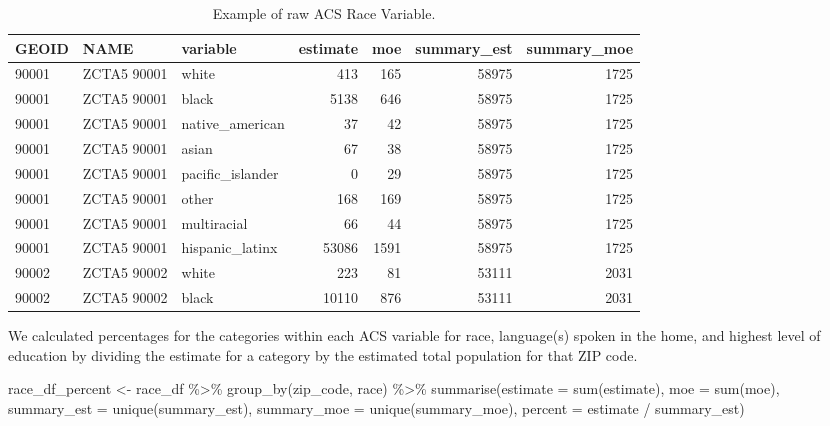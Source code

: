 \documentclass[
  11 pt,
  openany]{book}
\newenvironment{Shaded}{\begin{snugshade}}{\end{snugshade}}
\newcommand{\AttributeTok}[1]{\textcolor[rgb]{0.77,0.63,0.00}{#1}}
\newcommand{\FunctionTok}[1]{\textcolor[rgb]{0.00,0.00,0.00}{#1}}
\newcommand{\NormalTok}[1]{#1}
\newcommand{\OtherTok}[1]{\textcolor[rgb]{0.56,0.35,0.01}{#1}}
\newcommand{\SpecialCharTok}[1]{\textcolor[rgb]{0.00,0.00,0.00}{#1}}
\begin{document}
\begin{table}

\caption{\label{tab:acs-race-tab}Example of raw ACS Race Variable.}
\centering
\begin{tabular}[t]{l|l|l|r|r|r|r}
\hline
GEOID & NAME & variable & estimate & moe & summary\_est & summary\_moe\\
\hline
90001 & ZCTA5 90001 & white & 413 & 165 & 58975 & 1725\\
\hline
90001 & ZCTA5 90001 & black & 5138 & 646 & 58975 & 1725\\
\hline
90001 & ZCTA5 90001 & native\_american & 37 & 42 & 58975 & 1725\\
\hline
90001 & ZCTA5 90001 & asian & 67 & 38 & 58975 & 1725\\
\hline
90001 & ZCTA5 90001 & pacific\_islander & 0 & 29 & 58975 & 1725\\
\hline
90001 & ZCTA5 90001 & other & 168 & 169 & 58975 & 1725\\
\hline
90001 & ZCTA5 90001 & multiracial & 66 & 44 & 58975 & 1725\\
\hline
90001 & ZCTA5 90001 & hispanic\_latinx & 53086 & 1591 & 58975 & 1725\\
\hline
90002 & ZCTA5 90002 & white & 223 & 81 & 53111 & 2031\\
\hline
90002 & ZCTA5 90002 & black & 10110 & 876 & 53111 & 2031\\
\hline
\end{tabular}
\end{table}

We calculated percentages for the categories within each ACS variable for race, language(s) spoken in the home, and highest level of education by dividing the estimate for a category by the estimated total population for that ZIP code.

\begin{Shaded}
\begin{Highlighting}[]
\NormalTok{race\_df\_percent }\OtherTok{\textless{}{-}} 
\NormalTok{  race\_df }\SpecialCharTok{\%\textgreater{}\%} 
  \FunctionTok{group\_by}\NormalTok{(zip\_code, race) }\SpecialCharTok{\%\textgreater{}\%} 
  \FunctionTok{summarise}\NormalTok{(}\AttributeTok{estimate =} \FunctionTok{sum}\NormalTok{(estimate),}
            \AttributeTok{moe =} \FunctionTok{sum}\NormalTok{(moe),}
            \AttributeTok{summary\_est =} \FunctionTok{unique}\NormalTok{(summary\_est),}
            \AttributeTok{summary\_moe =} \FunctionTok{unique}\NormalTok{(summary\_moe),}
            \AttributeTok{percent =}\NormalTok{ estimate }\SpecialCharTok{/}\NormalTok{ summary\_est)}
\end{Highlighting}
\end{Shaded}
\end{document}
